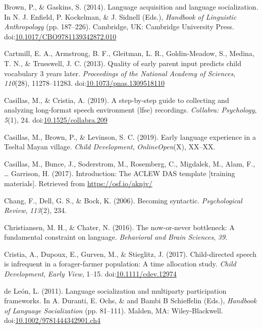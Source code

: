 \documentclass[,man,floatsintext]{apa6}
\begin{document}
\hypertarget{ref-brown2014language}{}
Brown, P., \& Gaskins, S. (2014). Language acquisition and language
socialization. In N. J. Enfield, P. Kockelman, \& J. Sidnell (Eds.),
\emph{Handbook of Linguistic Anthropology} (pp. 187--226). Cambridge,
UK: Cambridge University Press.
doi:\href{https://doi.org/10.1017/CBO9781139342872.010}{10.1017/CBO9781139342872.010}

\hypertarget{ref-cartmill2013quality}{}
Cartmill, E. A., Armstrong, B. F., Gleitman, L. R., Goldin-Meadow, S.,
Medina, T. N., \& Trueswell, J. C. (2013). Quality of early parent input
predicts child vocabulary 3 years later. \emph{Proceedings of the
National Academy of Sciences}, \emph{110}(28), 11278--11283.
doi:\href{https://doi.org/10.1073/pnas.1309518110}{10.1073/pnas.1309518110}

\hypertarget{ref-casillas2019stepbystep}{}
Casillas, M., \& Cristia, A. (2019). A step-by-step guide to collecting
and analyzing long-format speech environment (lfse) recordings.
\emph{Collabra: Psychology}, \emph{5}(1), 24.
doi:\href{https://doi.org/10.1525/collabra.209}{10.1525/collabra.209}

\hypertarget{ref-casillas2019early}{}
Casillas, M., Brown, P., \& Levinson, S. C. (2019). Early language
experience in a Tseltal Mayan village. \emph{Child Development},
\emph{OnlineOpen}(X), XX--XX.

\hypertarget{ref-casillas2017ACLEWDAS}{}
Casillas, M., Bunce, J., Soderstrom, M., Rosemberg, C., Migdalek, M.,
Alam, F., \ldots{} Garrison, H. (2017). Introduction: The ACLEW DAS
template {[}training materials{]}. Retrieved from
\url{https://osf.io/aknjv/}

\hypertarget{ref-chang2006becoming}{}
Chang, F., Dell, G. S., \& Bock, K. (2006). Becoming syntactic.
\emph{Psychological Review}, \emph{113}(2), 234.

\hypertarget{ref-christiansen2016now}{}
Christiansen, M. H., \& Chater, N. (2016). The now-or-never bottleneck:
A fundamental constraint on language. \emph{Behavioral and Brain
Sciences}, \emph{39}.

\hypertarget{ref-cristia2017child}{}
Cristia, A., Dupoux, E., Gurven, M., \& Stieglitz, J. (2017).
Child-directed speech is infrequent in a forager-farmer population: A
time allocation study. \emph{Child Development}, \emph{Early View},
1--15. doi:\href{https://doi.org/10.1111/cdev.12974}{10.1111/cdev.12974}

\hypertarget{ref-deleon2011language}{}
de León, L. (2011). Language socialization and multiparty participation
frameworks. In A. Duranti, E. Ochs, \& and Bambi B Schieffelin (Eds.),
\emph{Handbook of Language Socialization} (pp. 81--111). Malden, MA:
Wiley-Blackwell.
doi:\href{https://doi.org/10.1002/9781444342901.ch4}{10.1002/9781444342901.ch4}
\end{document}
